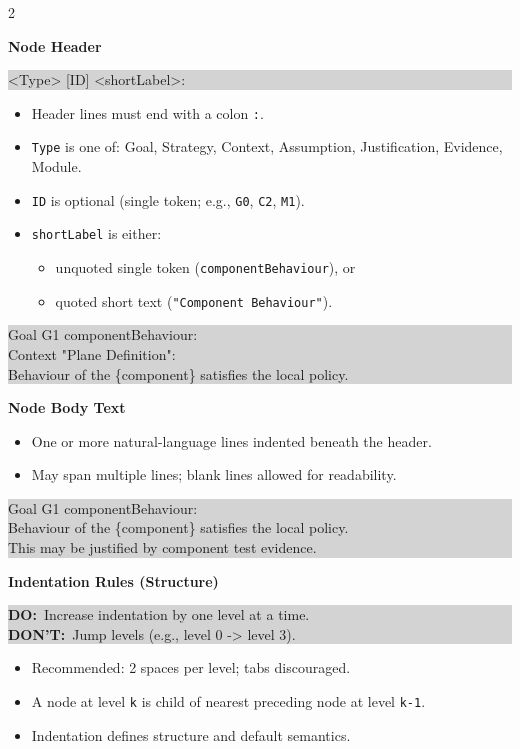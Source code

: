 \documentclass[10pt,letterpaper]{article}
\newcommand{\Sec}[1]{%
  \vspace{5pt}%
  \noindent{\color{RuleGray}\rule{\linewidth}{0.35pt}}\par
  \vspace{2pt}%
  {\bfseries #1}\par
  \vspace{2pt}%
}
\newcommand{\Example}[1]{%
  \vspace{1pt}%
  \noindent\colorbox{LightGray}{%
    \parbox{\linewidth}{\ttfamily\footnotesize\raggedright
#1
    }%
  }%
  \vspace{2pt}%
}
\newcommand{\DoDont}[2]{%
  \vspace{1pt}%
  \noindent\colorbox{LightGray}{%
    \parbox{\linewidth}{\small\textbf{DO:}~#1\hfill \textbf{DON'T:}~#2}%
  }%
  \vspace{2pt}%
}
\begin{document}
\begin{multicols*}{2}
\Sec{Node Header}
\Example{<Type> [ID] <shortLabel>:}
\begin{itemize}
  \item Header lines must end with a colon \texttt{:}.
  \item \texttt{Type} is one of: Goal, Strategy, Context, Assumption, Justification, Evidence, Module.
  \item \texttt{ID} is optional (single token; e.g., \texttt{G0}, \texttt{C2}, \texttt{M1}).
  \item \texttt{shortLabel} is either:
  \begin{itemize}
    \item unquoted single token (\texttt{componentBehaviour}), or
    \item quoted short text (\texttt{"Component Behaviour"}).
  \end{itemize}
\end{itemize}
\Example{Goal G1 componentBehaviour:\\
Context "Plane Definition":\\
\hspace*{1.5em}Behaviour of the \{component\} satisfies the local policy.}

\Sec{Node Body Text}
\begin{itemize}
  \item One or more natural-language lines indented beneath the header.
  \item May span multiple lines; blank lines allowed for readability.
\end{itemize}
\Example{Goal G1 componentBehaviour:\\
\hspace*{1.5em}Behaviour of the \{component\} satisfies the local policy.\\
\hspace*{1.5em}This may be justified by component test evidence.}

\columnbreak

\Sec{Indentation Rules (Structure)}
\DoDont{Increase indentation by one level at a time.\\}{Jump levels (e.g., level 0 -> level 3).}
\begin{itemize}
  \item Recommended: 2 spaces per level; tabs discouraged.
  \item A node at level \texttt{k} is child of nearest preceding node at level \texttt{k-1}.
  \item Indentation defines structure and default semantics.
\end{itemize}
\vspace{-6pt}



\end{multicols*}
\end{document}
